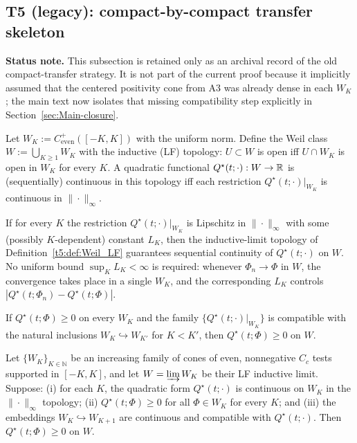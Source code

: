 \subsection{T5 (legacy): compact-by-compact transfer skeleton}

\noindent\textbf{Status note.} This subsection is retained only as an archival record of the old compact-transfer strategy. It is not part of the current proof because it implicitly assumed that the centered positivity cone from A3 was already dense in each $W_K$; the main text now isolates that missing compatibility step explicitly in Section~\ref{sec:Main-closure}.
\begin{definition}\label{t5:def:Weil_LF}
Let $W_K:=C^+_{\mathrm{even}}([-K,K])$ with the uniform norm. Define the Weil class $W:=\bigcup_{K\ge1} W_K$ with the inductive (LF) topology: $U\subset W$ is open iff $U\cap W_K$ is open in $W_K$ for every $K$. A quadratic functional $Q^\star(t;\cdot):W\to\mathbb R$ is (sequentially) continuous in this topology iff each restriction $Q^\star(t;\cdot)|_{W_K}$ is continuous in $\|\cdot\|_\infty$.
\end{definition}

\begin{lemma}\label{t5:lem:local-Lip}
If for every $K$ the restriction $Q^\star(t;\cdot)|_{W_K}$ is Lipschitz in $\|\cdot\|_\infty$ with some (possibly $K$-dependent) constant $L_K$, then the inductive-limit topology of Definition~\ref{t5:def:Weil_LF} guarantees sequential continuity of $Q^\star(t;\cdot)$ on $W$. No uniform bound $\sup_K L_K<\infty$ is required: whenever $\Phi_n\to\Phi$ in $W$, the convergence takes place in a single $W_K$, and the corresponding $L_K$ controls $|Q^\star(t;\Phi_n)-Q^\star(t;\Phi)|$.
\end{lemma}

\begin{lemma}\label{t5:lem:T5_transfer}
If $Q^\star(t;\Phi)\ge0$ on every $W_K$ and the family $\{Q^\star(t;\cdot)|_{W_K}\}$ is compatible with the natural inclusions $W_K\hookrightarrow W_{K'}$ for $K<K'$, then $Q^\star(t;\Phi)\ge0$ on $W$.
\end{lemma}

\begin{proposition}\label{t5:prop:T5_transfer_formal_aux}
Let $\{W_K\}_{K\in\mathbb N}$ be an increasing family of cones of even, nonnegative $C_c$ tests supported in $[-K,K]$, and let $W=\varinjlim W_K$ be their LF inductive limit. Suppose: (i) for each $K$, the quadratic form $Q^\star(t;\cdot)$ is continuous on $W_K$ in the $\|\cdot\|_\infty$ topology; (ii) $Q^\star(t;\Phi)\ge 0$ for all $\Phi\in W_K$ for every $K$; and (iii) the embeddings $W_K\hookrightarrow W_{K+1}$ are continuous and compatible with $Q^\star(t;\cdot)$. Then $Q^\star(t;\Phi)\ge 0$ on $W$.
\end{proposition}

